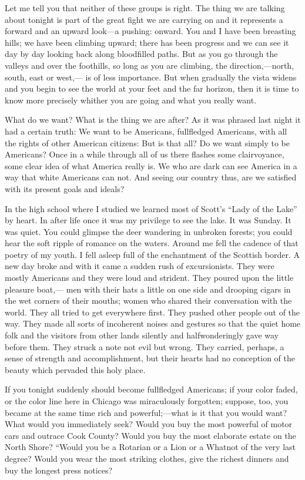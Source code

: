 \documentclass[letterpaper,10pt,english]{jupyterBook}
\begin{document}
\sphinxAtStartPar
Let me tell you that neither of these groups is right. The thing we are talking about tonight is part of the great fight we are carrying on and it represents a forward and an upward look—a pushing: onward. You and I have been breasting hills; we have been climbing upward; there has been progress and we can see it day by day looking back along blood\sphinxhyphen{}filled paths. But as you go through the valleys and over the foothills, so long as you are climbing, the direction,—north, south, east or west,— is of less importance. But when gradually the vista widens and you begin to see the world at your feet and the far horizon, then it is time to know more precisely whither you are going and what you really want.

\sphinxAtStartPar
What do we want? What is the thing we are after? As it was phrased last night it had a certain truth: We want to be Americans, full\sphinxhyphen{}fledged Americans, with all the rights of other American citizens: But is that all? Do we want simply to be Americans? Once in a while through all of us there flashes some clairvoyance, some clear idea of what America really is. We who are dark can see America in a way that white Americans can not. And seeing our country thus, are we satisfied with its present goals and ideals?

\sphinxAtStartPar
In the high school where I studied we learned most of Scott’s “Lady of the Lake” by heart. In after life once it was my privilege to see the lake. It was Sunday. It was quiet. You could glimpse the deer wandering in unbroken forests; you could hear the soft ripple of romance on the waters. Around me fell the cadence of that poetry of my youth. I fell asleep full of the enchantment of the Scottish border. A new day broke and with it came a sudden rush of excursionists. They were mostly Americans and they were loud and strident. They poured upon the little pleasure boat,— men with their hats a little on one side and drooping cigars in the wet corners of their mouths; women who shared their conversation with the world. They all tried to get everywhere first. They pushed other people out of the way. They made all sorts of incoherent noises and gestures so that the quiet home folk and the visitors from other lands silently and half\sphinxhyphen{}wonderingly gave way before them. They struck a note not evil but wrong. They carried, perhaps, a sense of strength and accomplishment, but their hearts had no conception of the beauty which pervaded this holy place.

\sphinxAtStartPar
If you tonight suddenly should become full\sphinxhyphen{}fledged Americans; if your color faded, or the color line here in Chicago was miraculously forgotten; suppose, too, you became at the same time rich and powerful;—what is it that you would want? What would you immediately seek? Would you buy the most powerful of motor cars and outrace Cook County? Would you buy the most elaborate estate on the North Shore? “Would you be a Rotarian or a Lion or a What\sphinxhyphen{}not of the very last degree? Would you wear the most striking clothes, give the richest dinners and buy the longest press notices?
\end{document}
